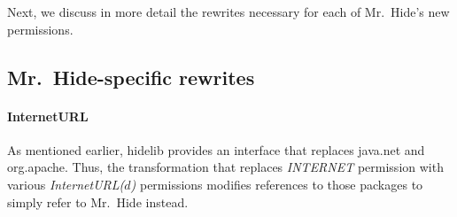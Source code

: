 \documentclass[preprint]{sig-alternate-10pt}
\newcommand{\code}[1]{\textsf{#1}}
\newcommand{\lib}{Mr.\ Hide\xspace}
\newcommand{\rewriter}{Dr.\ Android\xspace}
\newcommand{\perm}[1]{\textsf{\textit{#1}}}
\newcommand{\comment}[3][\color{red}]{}%
\newcommand{\jeff}[1]{\comment[\color{green}]{JSF}{#1}}
\newcommand{\jsjeon}[1]{\comment[\color{red}]{JJ}{#1}}
\begin{document}


Next, we discuss in more detail the rewrites necessary for each of
\lib's new permissions.

\subsection{\lib-specific rewrites}
\label{sec:specific-xform}

\paragraph*{InternetURL}
As mentioned earlier, \code{hidelib} provides an interface that replaces
\code{java.net} and \code{org.apache}. Thus, the
transformation that replaces \perm{INTERNET} permission with various
\perm{InternetURL($d$)} permissions modifies references to those
packages to simply refer to \lib instead.
\end{document}
